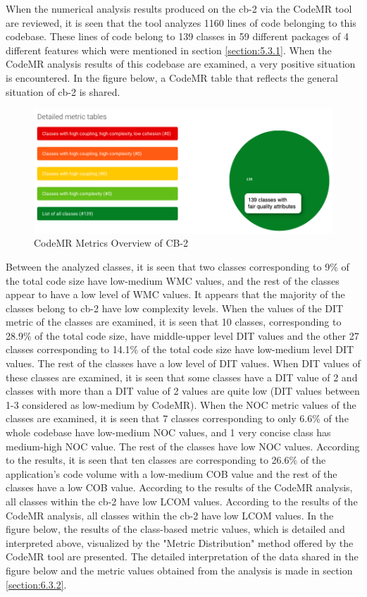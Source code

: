 When the numerical analysis results produced on the cb-2 via the CodeMR tool are reviewed, it is seen that the tool analyzes 1160 lines of code belonging to this codebase. These lines of code belong to 139 classes in 59 different packages of 4 different features which were mentioned in section \ref{section:5.3.1}. When the CodeMR analysis results of this codebase are examined, a very positive situation is encountered. In the figure below, a CodeMR table that reflects the general situation of cb-2 is shared.
\begin{figure}[ht!]
    \centering
    \includegraphics[scale=0.45]{figures/cb-2-metric-table.png}
    \caption{CodeMR Metrics Overview of CB-2}
    \label{fig:cb-2-metric-table.png}
\end{figure}
\FloatBarrier

Between the analyzed classes, it is seen that two classes corresponding to 9\% of the total code size have low-medium WMC values, and the rest of the classes appear to have a low level of WMC values. It appears that the majority of the classes belong to cb-2 have low complexity levels. When the values of the DIT metric of the classes are examined, it is seen that 10 classes, corresponding to 28.9\% of the total code size, have middle-upper level DIT values and the other 27 classes corresponding to 14.1\% of the total code size have low-medium level DIT values. The rest of the classes have a low level of DIT values.  When DIT values of these classes are examined, it is seen that some classes have a DIT value of 2 and classes with more than a DIT value of 2 values are quite low (DIT values between 1-3 considered as low-medium by CodeMR). When the NOC metric values of the classes are examined, it is seen that 7 classes corresponding to only 6.6\% of the whole codebase have low-medium NOC values, and 1 very concise class has medium-high NOC value. The rest of the classes have low NOC values. According to the results, it is seen that ten classes are corresponding to 26.6\% of the application's code volume with a low-medium COB value and the rest of the classes have a low COB value. According to the results of the CodeMR analysis, all classes within the cb-2 have low LCOM values. According to the results of the CodeMR analysis, all classes within the cb-2 have low LCOM values. In the figure below, the results of the class-based metric values, which is detailed and interpreted above, visualized by the "Metric Distribution" method offered by the CodeMR tool are presented. The detailed interpretation of the data shared in the figure below and the metric values obtained from the analysis is made in section \ref{section:6.3.2}.

